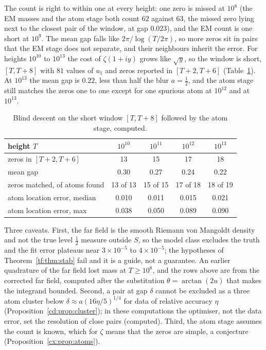 The count is right to within one at every height: one zero is missed at $10^8$ (the EM masses and the atom stage both count $62$ against $63$, the missed zero lying next to the closest pair of the window, at gap $0.023$), and the EM count is one short at $10^9$. The mean gap falls like $2\pi/\log(T/2\pi)$, so more zeros sit in pairs that the EM stage does not separate, and their neighbours inherit the error. For heights $10^{10}$ to $10^{13}$ the cost of $\zeta(1+iy)$ grows like $\sqrt y$, so the window is short, $[T,T+8]$ with $81$ values of $u_1$ and zeros reported in $[T+2,T+6]$ (Table~\ref{cx:tab:high}). At $10^{13}$ the mean gap is $0.22$, less than half the blur $a=\tfrac12$, and the atom stage still matches the zeros one to one except for one spurious atom at $10^{12}$ and at $10^{13}$.

\begin{table}[htbp]
\centering\footnotesize
\begin{tabular}{@{}lcccc@{}}
\toprule
height $T$ & $10^{10}$ & $10^{11}$ & $10^{12}$ & $10^{13}$\\
\midrule
zeros in $[T+2,T+6]$ & 13 & 15 & 17 & 18\\
mean gap & 0.30 & 0.27 & 0.24 & 0.22\\
zeros matched, of atoms found & 13 of 13 & 15 of 15 & 17 of 18 & 18 of 19\\
atom location error, median & 0.010 & 0.011 & 0.015 & 0.021\\
atom location error, max & 0.038 & 0.050 & 0.089 & 0.090\\
\bottomrule
\end{tabular}
\caption{Blind descent on the short window $[T,T+8]$ followed by the atom stage, computed.}
\label{cx:tab:high}
\end{table}

Three caveats. First, the far field is the smooth Riemann von Mangoldt density and not the true level $\tfrac12$ measure outside $S$, so the model class excludes the truth and the fit error plateaus near $3\times10^{-5}$ to $4\times10^{-5}$; the hypotheses of Theorem~\ref{tf:thm:stab} fail and it is a guide, not a guarantee. An earlier quadrature of the far field lost mass at $T\ge10^8$, and the rows above are from the corrected far field, computed after the substitution $\theta=\arctan(2u)$ that makes the integrand bounded. Second, a pair at gap $\delta$ cannot be excluded as a three atom cluster below $\delta\approx a(16\eta/5)^{1/4}$ for data of relative accuracy $\eta$ (Proposition~\ref{cd:prop:cluster}); in these computations the optimiser, not the data error, set the resolution of close pairs (computed). Third, the atom stage assumes the count is known, which for $\zeta$ means that the zeros are simple, a conjecture (Proposition~\ref{cx:prop:atoms}).

